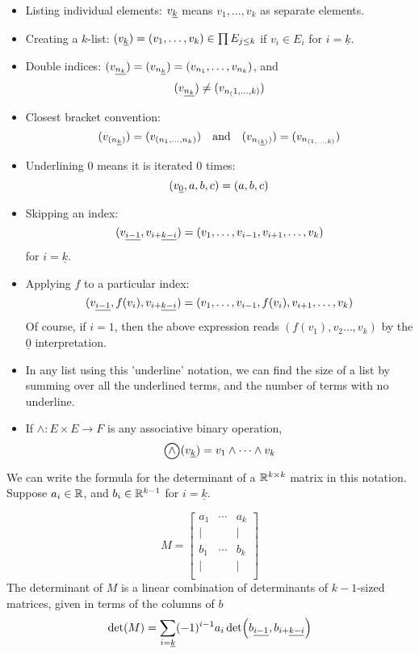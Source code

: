 \documentclass[../main-manifolds.tex]{subfiles}
\begin{document}
\begin{itemize}
    \item Listing individual elements: $\UL{v}[k]$ means $v_1,\ldots,v_k$ as separate elements. 
    \item Creating a $k$-list: $(\UL{v}[k]) = (v_1,\ldots, v_k)\in \prod E_{j\leq k}$ if $v_i\in E_i$ for $i = \underline{k}$.
    \item Double indices: $(\UL{v}[n_k]) = (v_{n_{\underline{k}}}) = (v_{n_1},\ldots, v_{n_k})$, and
    \[
        (\UL{v}[n_k]) \neq (v_{n_(1,\ldots,k)})
    \]
    \item Closest bracket convention:
    \[
        (v_{(n_{\underline{k}})}) = (v_{(n_1, \ldots, n_k)})\qqtext{and}(v_{n_{(\underline{k})})}) = (v_{n_{(1, \ldots, k)}})
    \]
    \item Underlining $0$ means it is iterated $0$ times: 
    \[
        (\UL{v}[0], a,b,c) = (a,b,c)
    \]
    \item Skipping an index: 
    \[
        (\UL{v}[i-1],\UL{v}[i+][k-i]) = (v_{1},\ldots, v_{i-1},v_{i+1},\ldots, v_{k})
    \]
    for $i = \underline{k}$.
    \item Applying $f$ to a particular index: 
    \[
        (\UL{v}[i-1], f(v_{i}), \UL{v}[i+][k-i]) = (v_1,\ldots, v_{i-1}, f(v_i), v_{i+1}, \ldots, v_k)
    \]
    Of course, if $i=1$, then the above expression reads $(f(v_1), v_2\ldots, v_k)$ by the $\underline{0}$ interpretation.
    \item In any list using this 'underline' notation, we can find the size of a list by summing over all the underlined terms, and the number of terms with no underline.
    \item If $\wedge: E\times E\to F$ is any associative binary operation,
    \[
        \bigowedge(\UL{v}[k]) = v_1\wedge\cdots \wedge v_k
    \]
\end{itemize}
\begin{remark}
We can write the formula for the determinant of a $\mathbb{R}^{k\times k}$ matrix in this notation. Suppose $a_i\in\mathbb{R}$, and $b_i\in\mathbb{R}^{k-1}$ for $i=\underline{k}$.

\[
M = \begin{bmatrix}
    a_1 & \cdots & a_k \\[1ex]
    \vert &  & \vert \\
    b_1 & \cdots & b_k \\
    \vert &  & \vert \\[1ex]
\end{bmatrix}
\]
The determinant of $M$ is a linear combination of determinants of $k-1$-sized matrices, given in terms of the columns of $b$
\[
    \det(M) = \sum_{i=\underline{k}}(-1)^{i-1} a_i\det(\UL{b}[i-1],\UL{b}[i+][k-i])
\]    
\end{remark}
\end{document}
